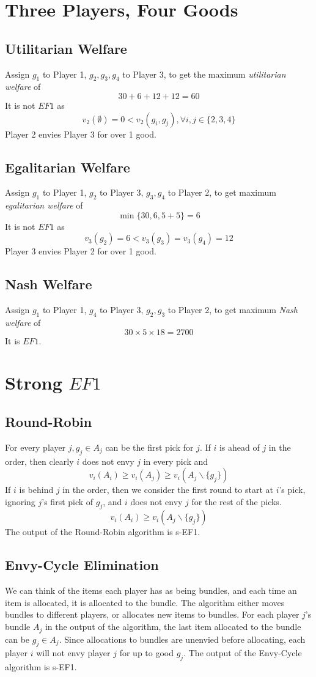 \newpage
\section{Three Players, Four Goods}

\subsection{Utilitarian Welfare}
Assign $g_1$ to Player 1, $g_2,g_3,g_4$ to Player 3,
to get the maximum \textit{utilitarian welfare} of
\[30+6+12+12=60\]
It is not $EF1$ as 
\[v_2(\emptyset)=0<v_2(g_i,g_j),\forall i,j\in \{2,3,4\}\]
Player 2 envies Player 3 for over 1 good.

\subsection{Egalitarian Welfare}
Assign $g_1$ to Player 1, $g_2$ to Player 3, $g_3,g_4$ to Player 2,
to get maximum \textit{egalitarian welfare} of
\[\min \{30,6,5+5\}=6\]
It is not $EF1$ as
\[v_3(g_2)=6<v_3(g_3)=v_3(g_4)=12\]
Player 3 envies Player 2 for over 1 good.

\subsection{Nash Welfare}
Assign $g_1$ to Player 1, $g_4$ to Player 3, $g_2,g_3$ to Player 2,
to get maximum \textit{Nash welfare} of
\[30\times 5\times 18=2700\]
It is $EF1$.

\newpage
\section{Strong $EF1$}

\subsection{Round-Robin}
For every player $j,g_j\in A_j$ can be the first pick for $j$.
If $i$ is ahead of $j$ in the order, then clearly $i$ does not envy
$j$ in every pick and 
\[v_i(A_i)\geq v_i(A_j) \geq v_i(A_j\backslash\{g_j\})\]
If $i$ is behind $j$ in the order, then we consider the first round
to start at $i$'s pick, ignoring $j$'s first pick of $g_j$,
and $i$ does not envy $j$ for the rest of the picks.
\[v_i(A_i)\geq v_i(A_j\backslash\{g_j\})\]
The output of the Round-Robin algorithm is s-EF1.

\subsection{Envy-Cycle Elimination}
We can think of the items each player has as being bundles,
and each time an item is allocated, it is allocated to the bundle.
The algorithm either moves bundles to different players, 
or allocates new items to bundles.
For each player $j$'s bundle $A_j$ in the output of the algorithm,
the last item allocated to the bundle can be $g_j\in A_j$. 
Since allocations to bundles are unenvied before allocating,
each player $i$ will not envy player $j$ for up to good $g_j$.
The output of the Envy-Cycle algorithm is s-EF1.

